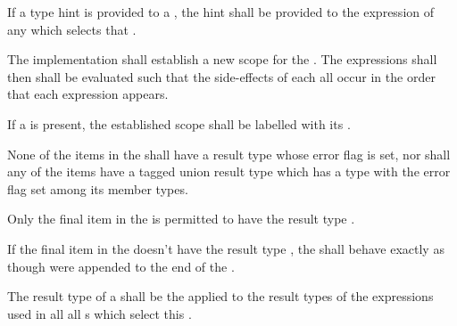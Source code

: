 \specsubsubitem
If a type hint is provided to a , the hint shall
be provided to the expression of any  which
selects that .

\specsubsubitem
The implementation shall establish a new scope for the
. The expressions shall then shall be evaluated
such that the side-effects of each all occur in the order that each expression
appears.

\specsubsubitem
If a  is present, the established scope shall be labelled
with its .

\specsubsubitem
None of the items in the  shall have a result type
whose error flag is set, nor shall any of the items have a tagged union result
type which has a type with the error flag set among its member types.

\specsubsubitem
Only the final item in the  is permitted to have
the result type .

\specsubsubitem
If the final item in the  doesn't have the result
type , the  shall behave
exactly as though  were appended to the end of the
.


\specsubsubitem
The result type of a  shall be the
 applied to the result types of the
expressions used in all all s which select this
.



